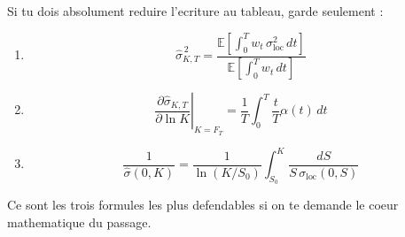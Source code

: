 \documentclass[11pt,a4paper]{article}
\begin{document}
Si tu dois absolument reduire l'ecriture au tableau, garde seulement :

\begin{enumerate}
\item
\[
\hat{\sigma}_{K,T}^{\,2}
=
\frac{\mathbb E[\int_0^T w_t\,\sigma_{\mathrm{loc}}^2\,dt]}
{\mathbb E[\int_0^T w_t\,dt]}
\]

\item
\[
\left.\frac{\partial \hat{\sigma}_{K,T}}{\partial \ln K}\right|_{K=F_T}
=
\frac{1}{T}\int_0^T \frac{t}{T}\alpha(t)\,dt
\]

\item
\[
\frac{1}{\hat{\sigma}(0,K)}
=
\frac{1}{\ln(K/S_0)}
\int_{S_0}^{K}\frac{dS}{S\,\sigma_{\mathrm{loc}}(0,S)}
\]
\end{enumerate}

Ce sont les trois formules les plus defendables si on te demande le coeur mathematique du passage.
\end{document}
